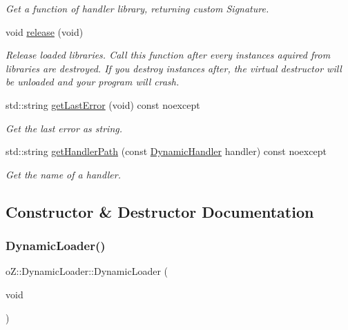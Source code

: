 \begin{DoxyCompactItemize}
\begin{DoxyCompactList}\small\item\em Get a function of handler library, returning custom Signature. \end{DoxyCompactList}\item 
void \mbox{\hyperlink{classo_z_1_1_dynamic_loader_a405559cdad1b8eba0bd3bee22fa764f9}{release}} (void)
\begin{DoxyCompactList}\small\item\em Release loaded libraries. Call this function after every instances aquired from libraries are destroyed. If you destroy instances after, the virtual destructor will be unloaded and your program will crash. \end{DoxyCompactList}\item 
std\+::string \mbox{\hyperlink{classo_z_1_1_dynamic_loader_ae822f62c912bfdc978188d22e45798ff}{get\+Last\+Error}} (void) const noexcept
\begin{DoxyCompactList}\small\item\em Get the last error as string. \end{DoxyCompactList}\item 
std\+::string \mbox{\hyperlink{classo_z_1_1_dynamic_loader_a732fb1a8c82a4caa1a5e3a227b9d32ab}{get\+Handler\+Path}} (const \mbox{\hyperlink{namespaceo_z_a4f8ae5685d0f7dca498d73129b482f2d}{Dynamic\+Handler}} handler) const noexcept
\begin{DoxyCompactList}\small\item\em Get the name of a handler. \end{DoxyCompactList}\end{DoxyCompactItemize}


\subsection{Constructor \& Destructor Documentation}
\mbox{\label{classo_z_1_1_dynamic_loader_ab046e300c6645cc5fdb1e3c1d0c4690b}} 
\subsubsection{\texorpdfstring{DynamicLoader()}{DynamicLoader()}}
{\footnotesize\ttfamily o\+Z\+::\+Dynamic\+Loader\+::\+Dynamic\+Loader (\begin{DoxyParamCaption}\item[{void}]{ }\end{DoxyParamCaption})\hspace{0.3cm}{\ttfamily [default]}}



